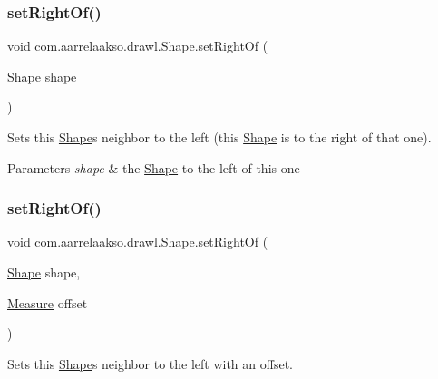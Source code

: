 \subsubsection{\texorpdfstring{set\+Right\+Of()}{setRightOf()}\hspace{0.1cm}{\footnotesize\ttfamily [1/2]}}
{\footnotesize\ttfamily void com.\+aarrelaakso.\+drawl.\+Shape.\+set\+Right\+Of (\begin{DoxyParamCaption}\item[{\hyperlink{classcom_1_1aarrelaakso_1_1drawl_1_1_shape}{Shape}}]{shape }\end{DoxyParamCaption})}



Sets this \hyperlink{classcom_1_1aarrelaakso_1_1drawl_1_1_shape}{Shape}\textquotesingle{}s neighbor to the left (this \hyperlink{classcom_1_1aarrelaakso_1_1drawl_1_1_shape}{Shape} is to the right of that one). 


\begin{DoxyParams}{Parameters}
{\em shape} & the \hyperlink{classcom_1_1aarrelaakso_1_1drawl_1_1_shape}{Shape} to the left of this one \\
\hline
\end{DoxyParams}
\mbox{\label{classcom_1_1aarrelaakso_1_1drawl_1_1_shape_a5bdc7b20e5863cf6c83a8abe57ce1399}} 
\subsubsection{\texorpdfstring{set\+Right\+Of()}{setRightOf()}\hspace{0.1cm}{\footnotesize\ttfamily [2/2]}}
{\footnotesize\ttfamily void com.\+aarrelaakso.\+drawl.\+Shape.\+set\+Right\+Of (\begin{DoxyParamCaption}\item[{\hyperlink{classcom_1_1aarrelaakso_1_1drawl_1_1_shape}{Shape}}]{shape,  }\item[{\hyperlink{classcom_1_1aarrelaakso_1_1drawl_1_1_measure}{Measure}}]{offset }\end{DoxyParamCaption})}



Sets this \hyperlink{classcom_1_1aarrelaakso_1_1drawl_1_1_shape}{Shape}\textquotesingle{}s neighbor to the left with an offset. 

